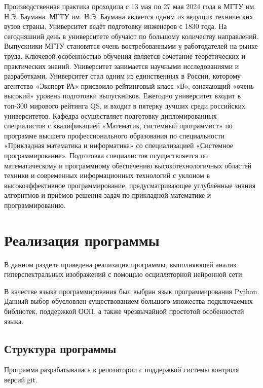 \documentclass[14pt, russian]{scrartcl}
\begin{document}
Производственная практика проходила с 13 мая по 27 мая 2024 года в МГТУ
им. Н.Э. Баумана.
МГТУ им. Н.Э. Баумана является одним из ведущих технических вузов
страны. Университет ведёт подготовку инженеров с 1830 года. На сегодняшний
день в университете обучают по большому количеству направлений. Выпускники
МГТУ становятся очень востребованными у работодателей на рынке труда. Ключевой особенностью обучения является сочетание теоретических и практических
знаний. Университет занимается научными исследованиями и разработками. Университет стал одним из единственных в России, которому агентство «Эксперт РА»
присвоило рейтинговый класс «В», означающий «очень высокий» уровень подготовки выпускников. Ежегодно университет входит в топ-300 мирового рейтинга
QS, и входит в пятерку лучших среди российских университетов.
Кафедра осуществляет подготовку дипломированных специалистов с квалификацией «Математик, системный программист» по программе высшего профессионального образования по специальности «Прикладная математика и информатика» со специализацией «Системное программирование».
Подготовка специалистов осуществляется по математическому и программному обеспечению высокотехнологичных областей техники и современных информационных технологий с уклоном в высокоэффективное программирование,
предусматривающее углублённые знания алгоритмов и приёмов решения задач по
прикладной математике и программированию.

\section{Реализация программы}

В данном разделе приведена реализация программы, выполняющей анализ гиперспектральных изображений с помощью осцилляторной нейронной сети.

В качестве языка программирования был выбран язык программирования Python. Данный выбор обусловлен существованием большого множества подключаемых библиотек,
поддержкой ООП, а также чрезвычайной простотой особенностей языка.

\subsection{Структура программы}

Программа разрабатывалась в репозитории с поддержкой системы контроля версий git.
\end{document}
